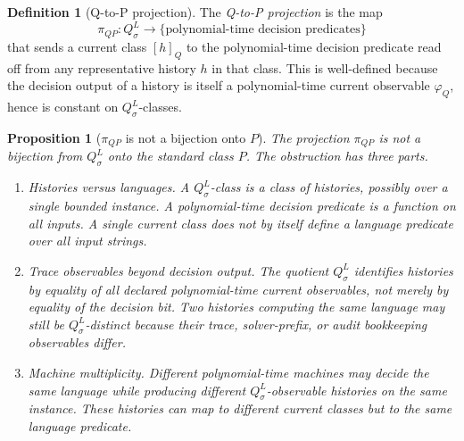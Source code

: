 \documentclass[11pt]{article}
\newcommand{\Substrate}{\sigma}             \newcommand{\Lift}{L}                       \newcommand{\LiftState}{\sigma_{L}}         \newcommand{\HistorySpace}{H_{\Substrate}^{\Lift}}
\newcommand{\Qquotient}{Q_{\Substrate}^{\Lift}}
\newcommand{\Qclass}[1]{[#1]_{Q}}
\newcommand{\CurrentObservable}{\varphi_{Q}}    \newcommand{\Exposure}{\operatorname{Exposure}}
\newcommand{\PiQP}{\pi_{QP}}                \newcommand{\PiMNP}{\pi_{MNP}}
\newtheorem{proposition}[theorem]{Proposition}
\theoremstyle{definition}
\newtheorem{definition}[theorem]{Definition}
\begin{document}
\begin{definition}[Q-to-P projection]
\label{def:projection-q-to-p}
The \emph{Q-to-P projection} is the map
\[
  \PiQP:\Qquotient\longrightarrow
  \{\text{polynomial-time decision predicates}\}
\]
that sends a current class \(\Qclass{h}\) to the polynomial-time
decision predicate read off from any representative history \(h\) in
that class.  This is well-defined because the decision output of a
history is itself a polynomial-time current observable
\(\CurrentObservable\), hence is constant on \(\Qquotient\)-classes.
\end{definition}

\begin{proposition}[\(\PiQP\) is not a bijection onto \(P\)]
\label{prop:c1-not-bijective}
The projection \(\PiQP\) is not a bijection from \(\Qquotient\) onto
the standard class \(P\).  The obstruction has three parts.
\begin{enumerate}
  \item \emph{Histories versus languages.}  A \(\Qquotient\)-class is
  a class of histories, possibly over a single bounded instance.  A
  polynomial-time decision predicate is a function on all inputs.  A
  single current class does not by itself define a language predicate
  over all input strings.

  \item \emph{Trace observables beyond decision output.}  The quotient
  \(\Qquotient\) identifies histories by equality of all declared
  polynomial-time current observables, not merely by equality of the
  decision bit.  Two histories computing the same language may still be
  \(\Qquotient\)-distinct because their trace, solver-prefix, or audit
  bookkeeping observables differ.

  \item \emph{Machine multiplicity.}  Different polynomial-time
  machines may decide the same language while producing different
  \(\Qquotient\)-observable histories on the same instance.  These
  histories can map to different current classes but to the same
  language predicate.
\end{enumerate}
\end{proposition}
\end{document}

